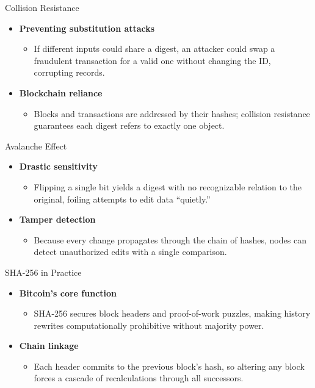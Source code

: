 \documentclass[aspectratio=169]{beamer}
\begin{document}
\begin{frame}{Collision Resistance}
  \begin{itemize}
    \item \textbf{Preventing substitution attacks}
      \begin{itemize}
        \item If different inputs could share a digest, an attacker could swap a fraudulent transaction for a valid one without changing the ID, corrupting records.
      \end{itemize}
    \item \textbf{Blockchain reliance}
      \begin{itemize}
        \item Blocks and transactions are addressed by their hashes; collision resistance guarantees each digest refers to exactly one object.
      \end{itemize}
  \end{itemize}
\end{frame}

\begin{frame}{Avalanche Effect}
  \begin{itemize}
    \item \textbf{Drastic sensitivity}
      \begin{itemize}
        \item Flipping a single bit yields a digest with no recognizable relation to the original, foiling attempts to edit data “quietly.”
      \end{itemize}
    \item \textbf{Tamper detection}
      \begin{itemize}
        \item Because every change propagates through the chain of hashes, nodes can detect unauthorized edits with a single comparison.
      \end{itemize}
  \end{itemize}
\end{frame}

\begin{frame}{SHA-256 in Practice}
  \begin{itemize}
    \item \textbf{Bitcoin’s core function}
      \begin{itemize}
        \item SHA-256 secures block headers and proof-of-work puzzles, making history rewrites computationally prohibitive without majority power.
      \end{itemize}
    \item \textbf{Chain linkage}
      \begin{itemize}
        \item Each header commits to the previous block’s hash, so altering any block forces a cascade of recalculations through all successors.
      \end{itemize}
  \end{itemize}
\end{frame}
\end{document}
